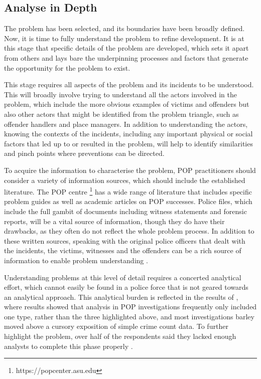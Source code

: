 \subsection{Analyse in Depth} The problem has been selected, and its boundaries have been broadly defined. Now, it is time to fully understand the problem to refine development. It is at this stage that specific details of the problem are developed, which sets it apart from others and lays bare the underpinning processes and factors that generate the opportunity for the problem to exist.

This stage requires all aspects of the problem and its incidents to be understood\parencite{clarke2003becoming}. This will broadly involve trying to understand all the actors involved in the problem, which include the more obvious examples of victims and offenders but also other actors that might be identified from the problem triangle, such as offender handlers and place managers. In addition to understanding the actors, knowing the contexts of the incidents, including any important physical or social factors that led up to or resulted in the problem, will help to identify similarities and pinch points where preventions can be directed.

To acquire the information to characterise the problem, POP practitioners should consider a variety of information sources, which should include the established literature. The POP centre \footnote{https://popcenter.asu.edu} has a wide range of literature that includes specific problem guides as well as academic articles on POP successes. Police files, which include the full gambit of documents including witness statements and forensic reports, will be a vital source of information, though they do have their drawbacks, as they often do not reflect the whole problem process. In addition to these written sources, speaking with the original police officers that dealt with the incidents, the victims, witnesses and the offenders can be a rich source of information to enable problem understanding \parencite{goldstein1990}. 

Understanding problems at this level of detail requires a concerted analytical effort, which cannot easily be found in a police force that is not geared towards an analytical approach. This analytical burden is reflected in the results of  \parencite{POPUCL}, where results showed that analysis in POP investigations frequently only included one type, rather than the three highlighted above, and most investigations barley moved above a cursory exposition of simple crime count data. To further highlight the problem, over half of the respondents said they lacked enough analysts to complete this phase properly \parencite{POPUCL}. 

